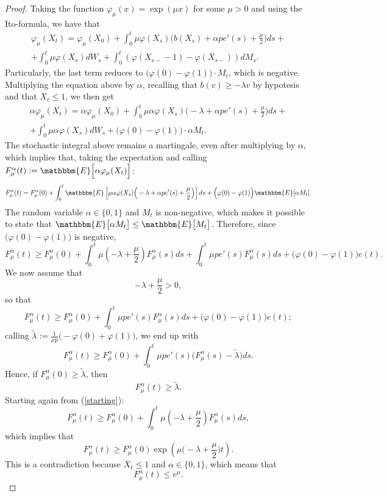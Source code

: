 \begin{proof}
Taking the function $\varphi_{\mu}(x) = \exp ( \mu x )$ for some $\mu > 0$ and using the Ito-formula, we have that \begin{multline*} \varphi_\mu (X_t) = \varphi_\mu (X_0) + \int_0^t \mu \varphi(X_s) \Big( b(X_s) + \alpha p e'(s) + \frac{\mu}{2} \Big) ds + \\ + \int_0^t \mu \varphi(X_s) d W_s + \int_0^t (\varphi(X_{s-} - 1) - \varphi(X_{s-})) dM_s.  \end{multline*}
Particularly, the last term reduces to $\big( \varphi(0) - \varphi(1) \big) \cdot M_t$, which is negative. Multiplying the equation above by $\alpha$, recalling that $b(v) \geq - \lambda v$ by hypotesis and that $X_t \leq 1$, we then get \begin{multline*} \alpha \varphi_\mu (X_t) = \alpha \varphi_\mu (X_0) + \int_0^t \mu \alpha \varphi(X_s) \Big( -\lambda + \alpha p e'(s) + \frac{\mu}{2} \Big) ds + \\ + \int_0^t \mu \alpha \varphi(X_s) d W_s + \big( \varphi(0) - \varphi(1) \big) \cdot \alpha M_t. \end{multline*}
The stochastic integral above remains a martingale, even after multiplying by $\alpha$, which implies that, taking the expectation and calling $F^\alpha_\mu(t) := \mathbbm{E} \Big[ \alpha \varphi_\mu (X_t) \Big]$: \[ F^\alpha_\mu(t) = F^\alpha_\mu(0) + \int_0^t \mathbbm{E} \left[ \mu \alpha \varphi(X_s) \Big( -\lambda + \alpha p e'(s) + \frac{\mu}{2} \Big) \right] ds + \Big( \varphi(0) - \varphi(1) \Big) \mathbbm{E}[\alpha M_t]. \] The random variable $\alpha \in \big\{ 0, 1 \big\}$ and $M_t$ is non-negative, which makes it possible to state that $\mathbbm{E} \big[ \alpha M_t \big] \leq \mathbbm{E} \big[ M_t \big]$. Therefore, since $\big( \varphi(0) - \varphi(1) \big)$ is negative, 
\begin{equation} 
\label{starting} F^\alpha_\mu(t) \geq F^\alpha_\mu(0) + \int_0^t \mu \left( - \lambda + \frac{\mu}{2} \right) F^\alpha_\mu(s) ds + \int_0^t \mu p e'(s) F^\alpha_\mu(s) ds + \Big( \varphi(0) - \varphi(1) \Big) e(t). \end{equation}
We now assume that \[ - \lambda + \frac{\mu}{2} > 0, \] so that \[ F^\alpha_\mu(t) \geq F^\alpha_\mu(0) + \int_0^t \mu p e'(s) F^\alpha_\mu(s) ds + \Big( \varphi(0) - \varphi(1) \Big) e(t); \] calling $\tilde{\lambda} := \frac{1}{\mu p} \big( - \varphi(0) + \varphi(1) \big)$, we end up with \[ F^\alpha_\mu(t) \geq F^\alpha_\mu(0) + \int_0^t \mu p e'(s) \Big( F^\alpha_\mu(s) - \tilde{\lambda} \Big) ds. \] Hence, if $F^\alpha_\mu(0) \geq \tilde{\lambda}$, then \[ F^\alpha_\mu(t) \geq \tilde{\lambda}. \] Starting again from (\ref{starting}): \[ F^\alpha_\mu(t) \geq F^\alpha_\mu(0) + \int_0^t \mu \left( -\lambda + \frac{\mu}{2} \right) F^\alpha_\mu(s) ds, \] which implies that \[ F^\alpha_\mu(t) \geq F^\alpha_\mu(0) \exp \left( \mu \Big( - \lambda + \frac{\mu}{2} \Big) t \right). \] This is a contradiction because $X_t \leq 1$ and $\alpha \in \{ 0, 1 \}$, which means that \[ F^\alpha_\mu (t) \leq e^\mu. \]
\end{proof}

